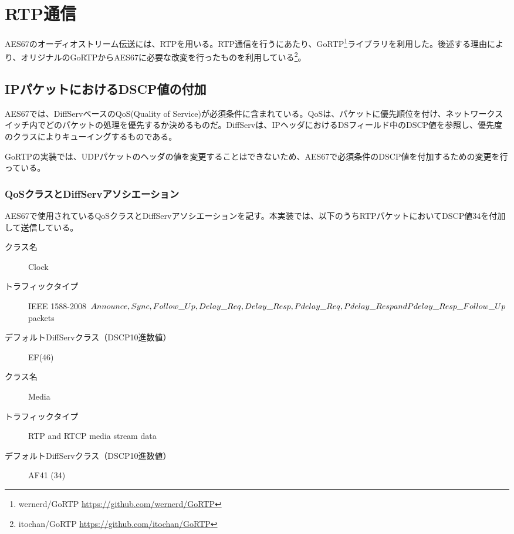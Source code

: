 \section{RTP通信}

AES67のオーディオストリーム伝送には、RTPを用いる。RTP通信を行うにあたり、GoRTP\footnote{wernerd/GoRTP \url{https://github.com/wernerd/GoRTP}}ライブラリを利用した。後述する理由により、オリジナルのGoRTPからAES67に必要な改変を行ったものを利用している\footnote{itochan/GoRTP \url{https://github.com/itochan/GoRTP}}。

\subsection{IPパケットにおけるDSCP値の付加}

AES67では、DiffServベースのQoS(Quality of Service)が必須条件に含まれている。QoSは、パケットに優先順位を付け、ネットワークスイッチ内でどのパケットの処理を優先するか決めるものだ。DiffServは、IPヘッダにおけるDSフィールド中のDSCP値を参照し、優先度のクラスによりキューイングするものである\cite{yamaha_diffserv}。

GoRTPの実装では、UDPパケットのヘッダの値を変更することはできないため、AES67で必須条件のDSCP値を付加するための変更を行っている。

\subsubsection{QoSクラスとDiffServアソシエーション}

AES67で使用されているQoSクラスとDiffServアソシエーションを記す\cite{aes67-2018}。本実装では、以下のうちRTPパケットにおいてDSCP値34を付加して送信している。

\begin{description}
  \item[クラス名] Clock
  \item[トラフィックタイプ] IEEE 1588-2008 $Announce, Sync, Follow\_Up, Delay\_Req, Delay\_Resp, \\Pdelay\_Req, Pdelay\_Resp and Pdelay\_Resp\_Follow\_Up$ packets
  \item[デフォルトDiffServクラス（DSCP10進数値）] EF(46)
\end{description}

\hrulefill

\begin{description}
  \item[クラス名] Media
  \item[トラフィックタイプ] RTP and RTCP media stream data
  \item[デフォルトDiffServクラス（DSCP10進数値）] AF41 (34)
\end{description}

